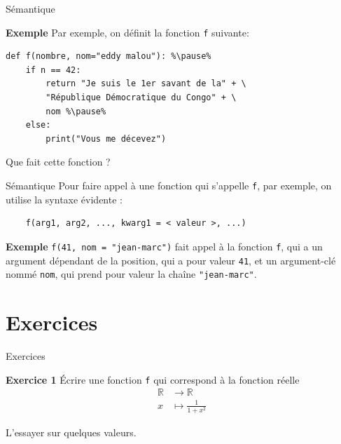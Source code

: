 \documentclass[10pt]{beamer}
\begin{document}
\begin{frame}[fragile]{Sémantique}
\begin{block}{\textbf{Exemple}}
Par exemple, on définit la fonction \lstinline|f| suivante:\pause
\begin{lstlisting}[escapechar=\%]
def f(nombre, nom="eddy malou"): %\pause%
    if n == 42:
        return "Je suis le 1er savant de la" + \
		"République Démocratique du Congo" + \
		nom %\pause%
    else:
        print("Vous me décevez")
\end{lstlisting}
\end{block}
\pause

Que fait cette fonction ?

\end{frame}

\begin{frame}[fragile]{Sémantique}
	Pour faire appel à une fonction qui s'appelle \lstinline|f|, par exemple, on utilise la syntaxe évidente :
	\begin{lstlisting}
	f(arg1, arg2, ..., kwarg1 = < valeur >, ...)
	\end{lstlisting}
	\pause
	
	\begin{block}{\textbf{Exemple}}
	\lstinline|f(41, nom = "jean-marc")| fait appel à la fonction \lstinline|f|, qui a un argument dépendant de la position, qui a pour valeur \lstinline|41|, et un argument-clé nommé \lstinline|nom|, qui prend pour valeur la chaîne \lstinline|"jean-marc"|.
	\end{block}
\end{frame}

\section{Exercices}

\begin{frame}[fragile]{Exercices}
\begin{block}{\textbf{Exercice 1}}
	Écrire une fonction \lstinline|f| qui correspond à la fonction réelle
    \[
    \begin{array}{rl}
    \mathbb{R} &\longrightarrow \mathbb{R} \\
    x &\longmapsto \frac{1}{1+x^2}
    \end{array}
    \]
    
    L'essayer sur quelques valeurs.
\end{block}
\end{frame}
\end{document}
